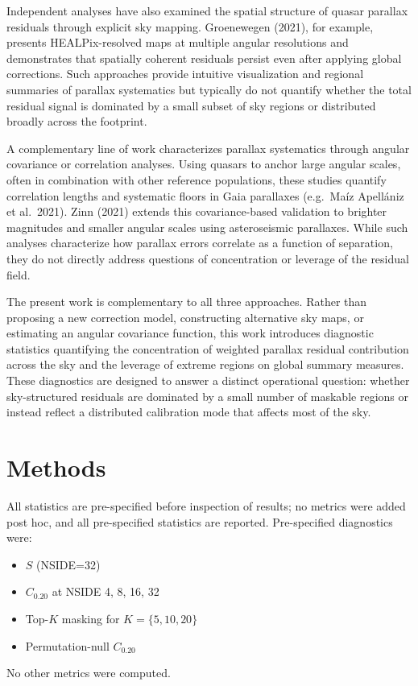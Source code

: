 \documentclass{aa}
\begin{document}
Independent analyses have also examined the spatial structure of quasar parallax residuals through explicit sky mapping. Groenewegen (2021), for example, presents HEALPix-resolved maps at multiple angular resolutions and demonstrates that spatially coherent residuals persist even after applying global corrections. Such approaches provide intuitive visualization and regional summaries of parallax systematics but typically do not quantify whether the total residual signal is dominated by a small subset of sky regions or distributed broadly across the footprint.

A complementary line of work characterizes parallax systematics through angular covariance or correlation analyses. Using quasars to anchor large angular scales, often in combination with other reference populations, these studies quantify correlation lengths and systematic floors in Gaia parallaxes (e.g.\ Ma\'iz Apell\'aniz et al.\ 2021). Zinn (2021) extends this covariance-based validation to brighter magnitudes and smaller angular scales using asteroseismic parallaxes. While such analyses characterize how parallax errors correlate as a function of separation, they do not directly address questions of concentration or leverage of the residual field.

The present work is complementary to all three approaches. Rather than proposing a new correction model, constructing alternative sky maps, or estimating an angular covariance function, this work introduces diagnostic statistics quantifying the concentration of weighted parallax residual contribution across the sky and the leverage of extreme regions on global summary measures. These diagnostics are designed to answer a distinct operational question: whether sky-structured residuals are dominated by a small number of maskable regions or instead reflect a distributed calibration mode that affects most of the sky.

\section{Methods}

All statistics are pre-specified before inspection of results; no metrics were added post hoc, and all pre-specified statistics are reported.
Pre-specified diagnostics were:
\begin{itemize}
\item $S$ (NSIDE=32)
\item $C_{0.20}$ at NSIDE 4, 8, 16, 32
\item Top-$K$ masking for $K=\{5,10,20\}$
\item Permutation-null $C_{0.20}$
\end{itemize}
No other metrics were computed.
\end{document}
